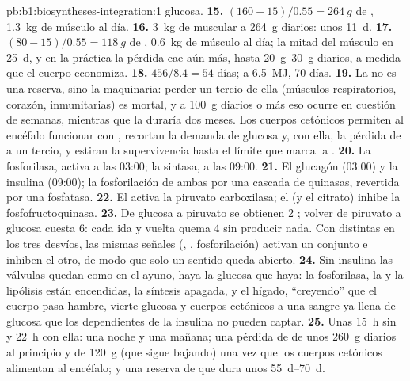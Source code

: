\begin{solution}{pb:b1:biosyntheses-integration:1}
glucosa.
\textbf{15.} $(160 - 15)/0.55 = \qty{264}{g}$ de , \qty{1.3}{kg} de
músculo al día.
\textbf{16.} \qty{3}{kg} de  muscular a \qty{264}{g} diarios: unos
\qty{11}{d}.
\textbf{17.} $(80 - 15)/0.55 = \qty{118}{g}$ de , \qty{0.6}{kg} de
músculo al día; la mitad del músculo en \qty{25}{d}, y en la práctica la
pérdida cae aún más, hasta \qtyrange{20}{30}{g} diarios, a medida que el
cuerpo economiza.
\textbf{18.} $456/8.4 = 54$ días; a \qty{6.5}{MJ}, 70 días.
\textbf{19.} La  no es una reserva, sino la maquinaria: perder un
tercio de ella (músculos respiratorios, corazón,  inmunitarias) es
mortal, y a \qty{100}{g} diarios o más eso ocurre en cuestión de semanas,
mientras que la  duraría dos meses. Los cuerpos cetónicos permiten al
encéfalo funcionar con , recortan la demanda de glucosa y, con ella, la
pérdida de  a un tercio, y estiran la supervivencia hasta el límite
que marca la .
\textbf{20.} La  fosforilasa, activa a las 03:00; la 
sintasa, a las 09:00.
\textbf{21.} El glucagón (03:00) y la insulina (09:00); la fosforilación de
ambas  por una cascada de quinasas, revertida por una fosfatasa.
\textbf{22.} El  activa la piruvato carboxilasa; el  (y el
citrato) inhibe la fosfofructoquinasa.
\textbf{23.} De glucosa a piruvato se obtienen 2 ; volver de piruvato a
glucosa cuesta 6: cada ida y vuelta quema 4  sin producir nada. Con
 distintas en los tres desvíos, las mismas señales (, ,
fosforilación) activan un conjunto e inhiben el otro, de modo que solo un
sentido queda abierto.
\textbf{24.} Sin insulina las válvulas quedan como en el ayuno, haya la
glucosa que haya: la fosforilasa, la  y la lipólisis están
encendidas, la síntesis apagada, y el hígado, ``creyendo'' que el cuerpo
pasa hambre, vierte glucosa y cuerpos cetónicos a una sangre ya llena de
glucosa que los  dependientes de la insulina no pueden captar.
\textbf{25.} Unas \qty{15}{h} sin  y \qty{22}{h} con ella:
una noche y una mañana; una pérdida de  de unos \qty{260}{g} diarios
al principio y de \qty{120}{g} (que sigue bajando) una vez que los cuerpos
cetónicos alimentan al encéfalo; y una reserva de  que dura unos
\qtyrange{55}{70}{d}.
\end{solution}
